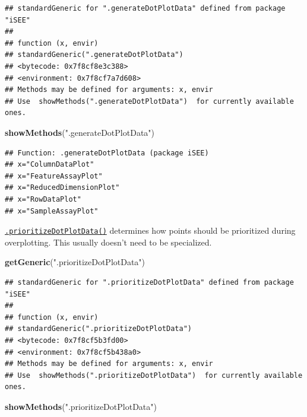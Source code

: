 \documentclass[
]{book}
\newenvironment{Shaded}{\begin{snugshade}}{\end{snugshade}}
\newcommand{\KeywordTok}[1]{\textcolor[rgb]{0.13,0.29,0.53}{\textbf{#1}}}
\newcommand{\NormalTok}[1]{#1}
\newcommand{\StringTok}[1]{\textcolor[rgb]{0.31,0.60,0.02}{#1}}
\begin{document}
\begin{verbatim}
## standardGeneric for ".generateDotPlotData" defined from package "iSEE"
## 
## function (x, envir) 
## standardGeneric(".generateDotPlotData")
## <bytecode: 0x7f8cf8e3c388>
## <environment: 0x7f8cf7a7d608>
## Methods may be defined for arguments: x, envir
## Use  showMethods(".generateDotPlotData")  for currently available ones.
\end{verbatim}

\begin{Shaded}
\begin{Highlighting}[]
\KeywordTok{showMethods}\NormalTok{(}\StringTok{".generateDotPlotData"}\NormalTok{)}
\end{Highlighting}
\end{Shaded}

\begin{verbatim}
## Function: .generateDotPlotData (package iSEE)
## x="ColumnDataPlot"
## x="FeatureAssayPlot"
## x="ReducedDimensionPlot"
## x="RowDataPlot"
## x="SampleAssayPlot"
\end{verbatim}

\href{https://isee.github.io/iSEE/reference/plot-generics.html}{\texttt{.prioritizeDotPlotData()}} determines how points should be prioritized during overplotting.
This usually doesn't need to be specialized.

\begin{Shaded}
\begin{Highlighting}[]
\KeywordTok{getGeneric}\NormalTok{(}\StringTok{".prioritizeDotPlotData"}\NormalTok{)}
\end{Highlighting}
\end{Shaded}

\begin{verbatim}
## standardGeneric for ".prioritizeDotPlotData" defined from package "iSEE"
## 
## function (x, envir) 
## standardGeneric(".prioritizeDotPlotData")
## <bytecode: 0x7f8cf5b3fd00>
## <environment: 0x7f8cf5b438a0>
## Methods may be defined for arguments: x, envir
## Use  showMethods(".prioritizeDotPlotData")  for currently available ones.
\end{verbatim}

\begin{Shaded}
\begin{Highlighting}[]
\KeywordTok{showMethods}\NormalTok{(}\StringTok{".prioritizeDotPlotData"}\NormalTok{)}
\end{Highlighting}
\end{Shaded}
\end{document}
